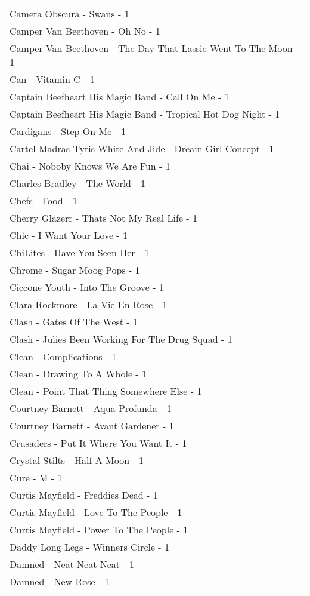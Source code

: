 \documentclass[
]{article}
\begin{document}
\begin{longtable}{l}
Camera Obscura - Swans - 1 \\ 
Camper Van Beethoven - Oh No - 1 \\ 
Camper Van Beethoven - The Day That Lassie Went To The Moon - 1 \\ 
Can - Vitamin C - 1 \\ 
Captain Beefheart His Magic Band - Call On Me - 1 \\ 
Captain Beefheart His Magic Band - Tropical Hot Dog Night - 1 \\ 
Cardigans - Step On Me - 1 \\ 
Cartel Madras Tyris White And Jide - Dream Girl Concept - 1 \\ 
Chai - Noboby Knows We Are Fun - 1 \\ 
Charles Bradley - The World - 1 \\ 
Chefs - Food - 1 \\ 
Cherry Glazerr - Thats Not My Real Life - 1 \\ 
Chic - I Want Your Love - 1 \\ 
ChiLites - Have You Seen Her - 1 \\ 
Chrome - Sugar Moog Pops - 1 \\ 
Ciccone Youth - Into The Groove - 1 \\ 
Clara Rockmore - La Vie En Rose - 1 \\ 
Clash - Gates Of The West - 1 \\ 
Clash - Julies Been Working For The Drug Squad - 1 \\ 
Clean - Complications - 1 \\ 
Clean - Drawing To A Whole - 1 \\ 
Clean - Point That Thing Somewhere Else - 1 \\ 
Courtney Barnett - Aqua Profunda - 1 \\ 
Courtney Barnett - Avant Gardener - 1 \\ 
Crusaders - Put It Where You Want It - 1 \\ 
Crystal Stilts - Half A Moon - 1 \\ 
Cure - M - 1 \\ 
Curtis Mayfield - Freddies Dead - 1 \\ 
Curtis Mayfield - Love To The People - 1 \\ 
Curtis Mayfield - Power To The People - 1 \\ 
Daddy Long Legs - Winners Circle - 1 \\ 
Damned - Neat Neat Neat - 1 \\ 
Damned - New Rose - 1 \\ 

\end{longtable}
\end{document}
